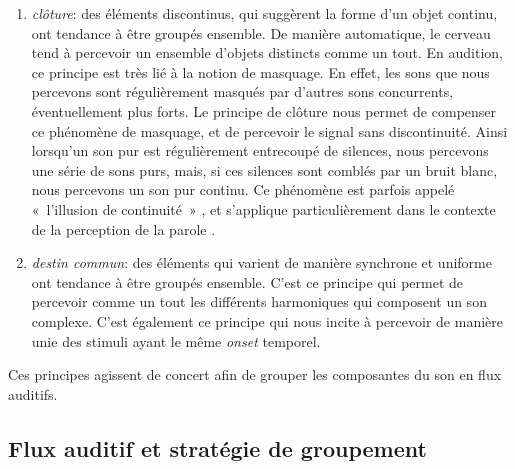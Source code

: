 \begin{enumerate}
\item \emph{clôture}: des éléments discontinus, qui suggèrent la forme d'un objet continu, ont tendance à être groupés ensemble. De manière automatique, le cerveau tend à percevoir un ensemble d'objets distincts comme un tout. En audition, ce principe est très lié à la notion de masquage. En effet, les sons que nous percevons sont régulièrement masqués par d'autres sons concurrents, éventuellement plus forts. Le principe de clôture nous permet de compenser ce phénomène de masquage, et de percevoir le signal sans discontinuité. Ainsi lorsqu'un son pur est régulièrement entrecoupé de silences, nous percevons une série de sons purs, mais, si ces silences sont comblés par un bruit blanc, nous percevons un son pur continu. Ce phénomène est parfois appelé «~l’illusion de continuité~» \citep{dannenbring1976perceived}, et s'applique particulièrement dans le contexte de la perception de la parole \citep{carlyon2002continuity}.
\item \emph{destin commun}: des éléments qui varient de manière synchrone et uniforme ont tendance à être groupés ensemble. C'est ce principe qui permet de percevoir comme un tout les différents harmoniques qui composent un son complexe. C'est également ce principe qui nous incite à percevoir de manière unie des stimuli ayant le même \emph{onset} temporel.
\end{enumerate}

Ces principes agissent de concert afin de grouper les composantes du son en flux auditifs.

\subsection{Flux auditif et stratégie de groupement}
\label{sec:ch3_asaFlux}

